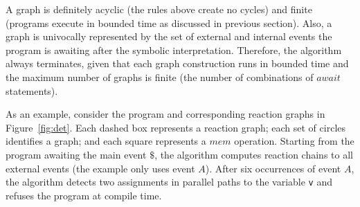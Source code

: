 \documentclass[preprint]{sigplanconf}
\newcommand{\code}[1] {{\small{\texttt{#1}}}}
\newcommand{\1}{\;}
\newcommand{\2}{\;\;}
\newcommand{\3}{\;\;\;}
\newcommand{\5}{\;\;\;\;\;}
\begin{document}
A graph is definitely acyclic (the rules above create no cycles) and finite 
(programs execute in bounded time as discussed in previous section).
Also, a graph is univocally represented by the set of external and internal 
events the program is awaiting after the symbolic interpretation.
Therefore, the algorithm always terminates, given that each graph construction 
runs in bounded time and the maximum number of graphs is finite (the number of 
combinations of $await$ statements).

As an example, consider the program and corresponding reaction graphs in 
Figure~\ref{fig:det}.
Each dashed box represents a reaction graph; each set of circles identifies a 
graph; and each square represents a $mem$ operation.
Starting from the program awaiting the main event $\$$, the algorithm computes 
reaction chains to all external events (the example only uses event $A$).
After six occurrences of event $A$, the algorithm detects two assignments in 
parallel paths to the variable \code{v} and refuses the program at compile 
time.
\end{document}
